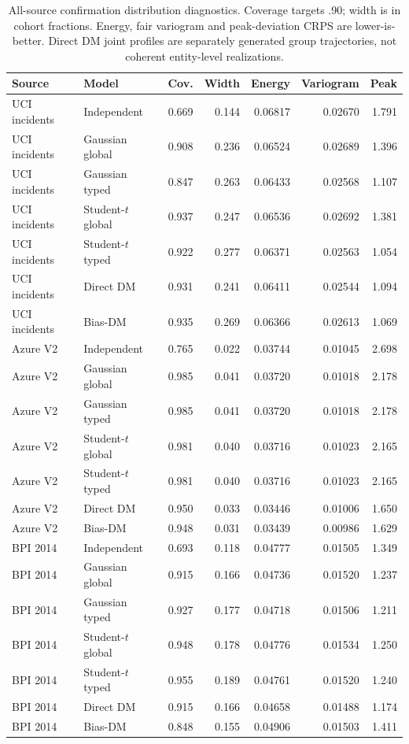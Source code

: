 \begin{table}[t]
\centering\small
\caption{All-source confirmation distribution diagnostics. Coverage targets .90; width is in cohort fractions. Energy, fair variogram and peak-deviation CRPS are lower-is-better. Direct DM joint profiles are separately generated group trajectories, not coherent entity-level realizations.}\label{tab:extension-joint}
\begin{tabular}{llrrrrr}
\toprule
Source & Model & Cov. & Width & Energy & Variogram & Peak \\
\midrule
UCI incidents & Independent & 0.669 & 0.144 & 0.06817 & 0.02670 & 1.791 \\
UCI incidents & Gaussian global & 0.908 & 0.236 & 0.06524 & 0.02689 & 1.396 \\
UCI incidents & Gaussian typed & 0.847 & 0.263 & 0.06433 & 0.02568 & 1.107 \\
UCI incidents & Student-$t$ global & 0.937 & 0.247 & 0.06536 & 0.02692 & 1.381 \\
UCI incidents & Student-$t$ typed & 0.922 & 0.277 & 0.06371 & 0.02563 & 1.054 \\
UCI incidents & Direct DM & 0.931 & 0.241 & 0.06411 & 0.02544 & 1.094 \\
UCI incidents & Bias-DM & 0.935 & 0.269 & 0.06366 & 0.02613 & 1.069 \\
Azure V2 & Independent & 0.765 & 0.022 & 0.03744 & 0.01045 & 2.698 \\
Azure V2 & Gaussian global & 0.985 & 0.041 & 0.03720 & 0.01018 & 2.178 \\
Azure V2 & Gaussian typed & 0.985 & 0.041 & 0.03720 & 0.01018 & 2.178 \\
Azure V2 & Student-$t$ global & 0.981 & 0.040 & 0.03716 & 0.01023 & 2.165 \\
Azure V2 & Student-$t$ typed & 0.981 & 0.040 & 0.03716 & 0.01023 & 2.165 \\
Azure V2 & Direct DM & 0.950 & 0.033 & 0.03446 & 0.01006 & 1.650 \\
Azure V2 & Bias-DM & 0.948 & 0.031 & 0.03439 & 0.00986 & 1.629 \\
BPI 2014 & Independent & 0.693 & 0.118 & 0.04777 & 0.01505 & 1.349 \\
BPI 2014 & Gaussian global & 0.915 & 0.166 & 0.04736 & 0.01520 & 1.237 \\
BPI 2014 & Gaussian typed & 0.927 & 0.177 & 0.04718 & 0.01506 & 1.211 \\
BPI 2014 & Student-$t$ global & 0.948 & 0.178 & 0.04776 & 0.01534 & 1.250 \\
BPI 2014 & Student-$t$ typed & 0.955 & 0.189 & 0.04761 & 0.01520 & 1.240 \\
BPI 2014 & Direct DM & 0.915 & 0.166 & 0.04658 & 0.01488 & 1.174 \\
BPI 2014 & Bias-DM & 0.848 & 0.155 & 0.04906 & 0.01503 & 1.411 \\
\bottomrule
\end{tabular}
\end{table}
